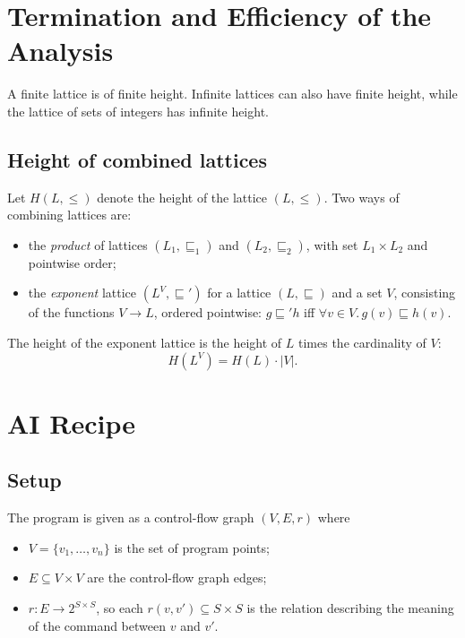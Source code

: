 \section{Termination and Efficiency of the Analysis}
 
 
 
A finite lattice is of finite height. Infinite lattices can also have finite height, while the lattice of sets of integers has infinite height.
 
\subsection*{Height of combined lattices}
 
Let $H(L, \le)$ denote the height of the lattice $(L, \le)$. Two ways of combining lattices are:
\begin{itemize}
  \item the \emph{product} of lattices $(L_1, \sqsubseteq_1)$ and $(L_2, \sqsubseteq_2)$, with set $L_1 \times L_2$ and pointwise order;
  \item the \emph{exponent} lattice $(L^V, \sqsubseteq')$ for a lattice $(L, \sqsubseteq)$ and a set $V$, consisting of the functions $V \to L$, ordered pointwise: $g \sqsubseteq' h$ iff $\forall v \in V.\, g(v) \sqsubseteq h(v)$.
\end{itemize}
The height of the exponent lattice is the height of $L$ times the cardinality of $V$:
\[
H(L^V) = H(L) \cdot |V|.

\]

\section{AI Recipe} 
\subsection*{Setup}
 
The program is given as a control-flow graph $(V, E, r)$ where
\begin{itemize}
  \item $V = \{v_1, \ldots, v_n\}$ is the set of program points;
  \item $E \subseteq V \times V$ are the control-flow graph edges;
  \item $r : E \to 2^{S \times S}$, so each $r(v, v') \subseteq S \times S$ is the relation describing the meaning of the command between $v$ and $v'$.
\end{itemize}
 
